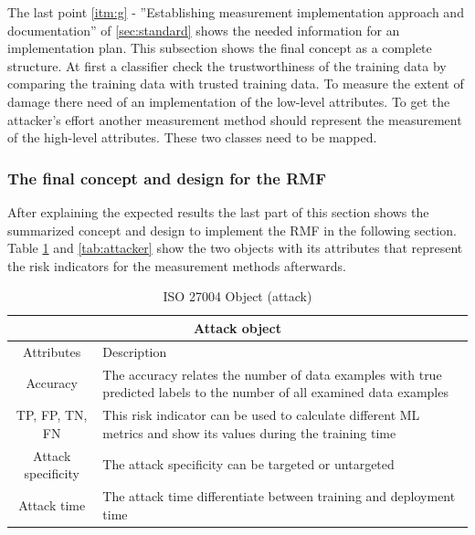 The last point \ref{itm:g} - ''Establishing measurement implementation approach and documentation'' of \ref{sec:standard} shows the needed information for an implementation plan. This subsection shows the final concept as a complete structure. At first a classifier check the trustworthiness of the training data by comparing the training data with trusted training data. To measure the extent of damage there need of an implementation of the low-level attributes. To get the attacker's effort another measurement method should represent the measurement of the high-level attributes. These two classes need to be mapped.

\subsubsection*{The final concept and design for the RMF}

After explaining the expected results the last part of this section shows the summarized concept and design to implement the RMF in the following section. Table \ref{tab:attack} and \ref{tab:attacker} show the two objects with its attributes that represent the risk indicators for the measurement methods afterwards.

\begin{table}[h]
\centering
  \begin{tabular}{|c|p{10cm}|}
  \hline
  \multicolumn{2}{|c|}{Attack object} \\
  \hline
  \rowcolor{lightgray} Attributes & Description \\ [0.5ex]
  \hline
  Accuracy & The accuracy relates the number of data examples with true predicted labels to the number of all examined data examples \cite{9783960101925} \\
  \hline
  TP, FP, TN, FN & This risk indicator can be used to calculate different ML metrics and show its values during the training time \\
  \hline
  Attack specificity & The attack specificity can be targeted or untargeted \\
  \hline
  Attack time & The attack time differentiate between training and deployment time \\
  \hline
  \end{tabular}
\caption{ISO 27004 Object (attack)}
\label{tab:attack}
\end{table}

